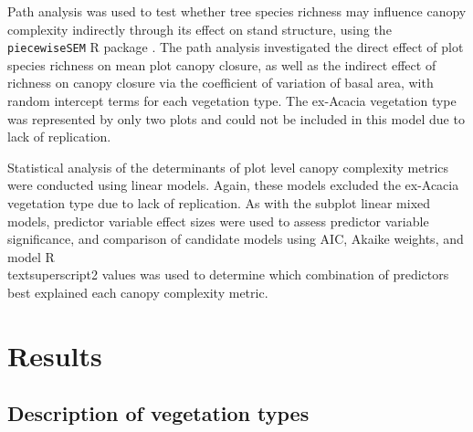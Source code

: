 \documentclass[11pt,a4paper]{article}
\begin{document}
Path analysis was used to test whether tree species richness may influence canopy complexity indirectly through its effect on stand structure, using the \texttt{piecewiseSEM} R package \citep{piecewiseSEM}. The path analysis investigated the direct effect of plot species richness on mean plot canopy closure, as well as the indirect effect of richness on canopy closure via the coefficient of variation of basal area, with random intercept terms for each vegetation type. The ex-Acacia vegetation type was represented by only two plots and could not be included in this model due to lack of replication.

Statistical analysis of the determinants of plot level canopy complexity metrics were conducted using linear models. Again, these models excluded the ex-Acacia vegetation type due to lack of replication. As with the subplot linear mixed models, predictor variable effect sizes were used to assess predictor variable significance, and comparison of candidate models using AIC, Akaike weights, and model R\\textsuperscript{2} values was used to determine which combination of predictors best explained each canopy complexity metric.





\section{Results}

\subsection{Description of vegetation types}
\end{document}
